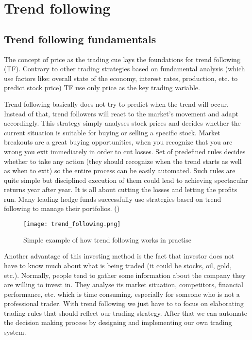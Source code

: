 
\section{Trend following}
\label{sec:trendFollowing}

\subsection{Trend following fundamentals}
\label{sec:trend_following_fundamentals}

The concept of price as the trading cue lays the foundations for trend following (TF). 
Contrary to other trading strategies based on fundamental analysis (which use factors like: overall state of the economy, interest rates, production, etc. to predict stock price)
TF use only price as the key trading variable. 

Trend following basically does not try to predict when the trend will occur. 
Instead of that, trend followers will react to the market's movement and adapt accordingly.
This strategy simply analyses stock prices and decides whether the current situation is suitable for buying or selling a specific stock.
Market breakouts are a great buying opportunities, when you recognize that you are wrong you exit immediately in order to cut losses.
Set of predefined rules decides  whether to take any action (they should recognize when the trend starts as well as when to exit) so the entire process can be easily automated.
Such rules are quite simple but disciplined execution of them could lead to achieving spectacular returns year after year.
It is all about cutting the losses and letting the profits run.
Many leading hedge funds successfully use strategies based on trend following to manage their portfolios. (\cite{Trend01})  

\clearpage
\begin{figure}[ht]
  \begin{center}
    \texttt{[image: trend\_following.png]}
  \end{center}
  \caption{Simple example of how trend following works in practise}
\end{figure}

Another advantage of this investing method is the fact that investor does not have to know much about what is being traded (it could be stocks, oil, gold, etc.).
Normally, people tend to gather some information about the company they are willing to invest in. 
They analyse its market situation, competitors, financial performance, etc. which is time consuming, especially for someone who is not a professional trader.
With trend following we just have to to focus on elaborating trading rules that should reflect our trading strategy.
After that we can automate the decision making process by designing and implementing our own trading system.   


